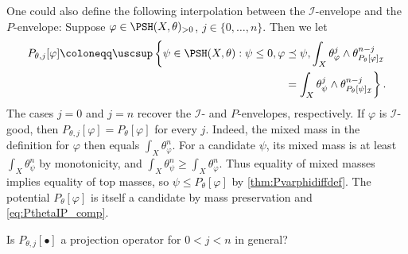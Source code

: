 \begin{remark}\label{rmk:envelopes:L2443}
    One could also define the following interpolation between the $\mathcal{I}$-envelope and the $P$-envelope: Suppose $\varphi\in \PSH(X,\theta)_{>0}$, $j\in \{0,\ldots,n\}$. Then we let
    \[
    \begin{split}
    P_{\theta,j}[\varphi]\coloneqq \uscsup \left\{ \psi\in \PSH(X,\theta): \psi\leq 0,\varphi\preceq \psi, \int_X \theta_{\varphi}^j\wedge \theta_{P_{\theta}[\varphi]_{\mathcal{I}}}^{n-j}\right.\\
    \left.=\int_X \theta_{\psi}^j\wedge \theta_{P_{\theta}[\psi]_{\mathcal{I}}}^{n-j} \right\}.
    \end{split}
    \]
    The cases $j=0$ and $j=n$ recover the $\mathcal{I}$- and $P$-envelopes, respectively. If $\varphi$ is $\mathcal{I}$-good, then $P_{\theta,j}[\varphi]=P_\theta[\varphi]$ for every $j$. Indeed, the mixed mass in the definition for $\varphi$ then equals $\int_X\theta_\varphi^n$. For a candidate $\psi$, its mixed mass is at least $\int_X\theta_\psi^n$ by monotonicity, and $\int_X\theta_\psi^n\geq\int_X\theta_\varphi^n$. Thus equality of mixed masses implies equality of top masses, so $\psi\leq P_\theta[\varphi]$ by \cref{thm:Pvarphidiffdef}. The potential $P_\theta[\varphi]$ is itself a candidate by mass preservation and \eqref{eq:PthetaIP_comp}.

    Is $P_{\theta,j}[\bullet]$ a projection operator for $0<j<n$ in general?
\end{remark}



%
